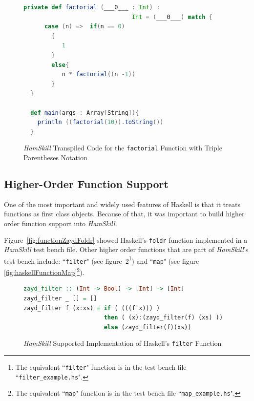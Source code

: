 \documentclass{report}
\begin{document}
\begin{figure}[H]
\begin{mdframed}
\begin{lstlisting}[language=Scala]
  private def factorial (___0___ : Int) :
                               Int = (___0___) match {
      case (n) =>  if(n == 0)
        {
           1
        }
        else{
           n * factorial((n -1))
        }
  } 
  
  def main(args : Array[String]){
    println ((factorial(10)).toString())
  } 
\end{lstlisting}
\end{mdframed}
\caption{\textit{HamSkill} Transpiled Code for the \texttt{factorial}  Function with Triple Parentheses Notation}\label{fig:scalaFunctionFactorial}
\end{figure}


\subsection{Higher-Order Function Support}\label{sec:higherOrderFunctions}

One of the most important and widely used features of Haskell is that it treats functions as first class objects.  Because of that, it was important to build higher order function support into \textit{HamSkill}.

Figure~\ref{fig:functionZaydFoldr} showed Haskell's \texttt{foldr} function implemented in a \textit{HamSkill} test bench file.  Other higher order functions that are part of \textit{HamSkill}'s test bench include: ``\texttt{filter}" (see figure~\ref{fig:haskellFunctionFilter}\footnote{The equivalent ``\texttt{filter}" function is in the test bench file ``\texttt{filter\_example.hs}".}) and ``\texttt{map}" (see figure \ref{fig:haskellFunctionMap}\footnote{The equivalent ``\texttt{map}" function is in the test bench file ``\texttt{map\_example.hs}".}).

\begin{figure}[H]
\begin{mdframed}
\begin{lstlisting}[language=Haskell, basicstyle=\small]
zayd_filter :: (Int -> Bool) -> [Int] -> [Int]
zayd_filter _ [] = []
zayd_filter f (x:xs) = if ( (((f x))) )
                       then ( (x):(zayd_filter(f) (xs) ))
                       else (zayd_filter(f)(xs))
\end{lstlisting}
\end{mdframed}
\caption{\textit{HamSkill} Supported Implementation of Haskell's \texttt{filter} Function}\label{fig:haskellFunctionFilter}
\end{figure}
\end{document}
